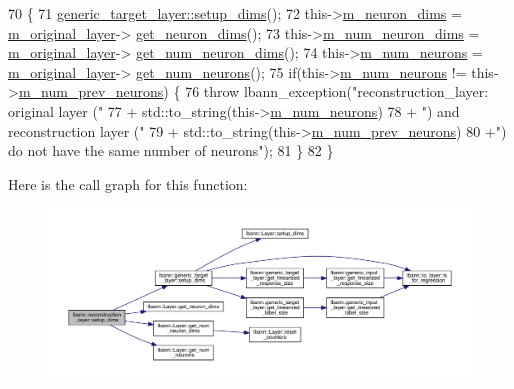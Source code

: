 \begin{DoxyCode}
70                              \{
71     \hyperlink{classlbann_1_1generic__target__layer_a3a970c1b23f7367276f7061563fc8b65}{generic\_target\_layer::setup\_dims}();
72     this->\hyperlink{classlbann_1_1Layer_abb34bb8031f57a483e2e327a5f229f48}{m\_neuron\_dims} = \hyperlink{classlbann_1_1reconstruction__layer_a077a29792de2a39015da8b18120a00e3}{m\_original\_layer}->
      \hyperlink{classlbann_1_1Layer_a54f53393fadbfdc73b4e72489c868433}{get\_neuron\_dims}();
73     this->\hyperlink{classlbann_1_1Layer_adfd6178d21498c9095cd947ae1eb2d6a}{m\_num\_neuron\_dims} = \hyperlink{classlbann_1_1reconstruction__layer_a077a29792de2a39015da8b18120a00e3}{m\_original\_layer}->
      \hyperlink{classlbann_1_1Layer_aa35561e662de84deae26045ccb53d862}{get\_num\_neuron\_dims}();
74     this->\hyperlink{classlbann_1_1Layer_a6b5ebc8a7d9329d8a773ed787e7b41d8}{m\_num\_neurons} = \hyperlink{classlbann_1_1reconstruction__layer_a077a29792de2a39015da8b18120a00e3}{m\_original\_layer}->
      \hyperlink{classlbann_1_1Layer_aa4de686cc6c2dd38166f42faf874f227}{get\_num\_neurons}();
75     \textcolor{keywordflow}{if}(this->\hyperlink{classlbann_1_1Layer_a6b5ebc8a7d9329d8a773ed787e7b41d8}{m\_num\_neurons} != this->\hyperlink{classlbann_1_1Layer_ac7b30f4e28d58204bfcbb76886f9136d}{m\_num\_prev\_neurons}) \{
76       \textcolor{keywordflow}{throw} lbann\_exception(\textcolor{stringliteral}{"reconstruction\_layer: original layer ("}
77                             + std::to\_string(this->\hyperlink{classlbann_1_1Layer_a6b5ebc8a7d9329d8a773ed787e7b41d8}{m\_num\_neurons})
78                             + \textcolor{stringliteral}{") and reconstruction layer ("}
79                             + std::to\_string(this->\hyperlink{classlbann_1_1Layer_ac7b30f4e28d58204bfcbb76886f9136d}{m\_num\_prev\_neurons})
80                             +\textcolor{stringliteral}{") do not have the same number of neurons"});
81     \}
82   \}
\end{DoxyCode}
Here is the call graph for this function\+:\nopagebreak
\begin{figure}[H]
\begin{center}
\leavevmode
\includegraphics[width=350pt]{classlbann_1_1reconstruction__layer_a3abb27b670b5c57f2a6b1d669a7de508_cgraph}
\end{center}
\end{figure}
\mbox{\label{classlbann_1_1reconstruction__layer_a09bf00610af66810bf8bbb65424d1e1a}} 
